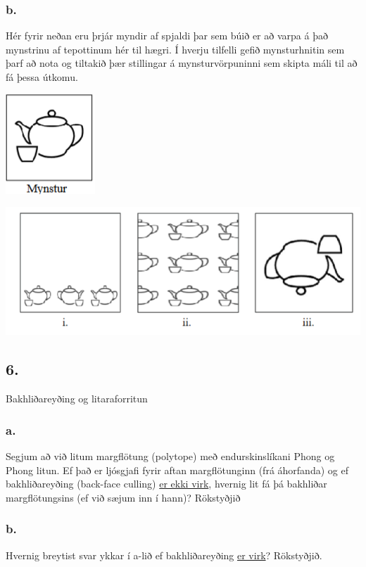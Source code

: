 \documentclass{article}
\begin{document}
\subsubsection{b.}Hér fyrir neðan eru þrjár myndir af spjaldi þar sem búið er að
varpa á það mynstrinu af tepottinum hér til hægri. Í hverju
tilfelli gefið mynsturhnitin sem þarf að nota og tiltakið þær
stillingar á mynsturvörpuninni sem skipta máli til að fá þessa
útkomu.

\includegraphics[scale = 0.9]{myndir/mynstur.png}

\begin{center}
\includegraphics[scale = 0.9]{myndir/mynstur2.png}
\end{center}


\newpage

\subsection{6.} Bakhliðareyðing og litaraforritun

\subsubsection{a.}Segjum að við litum margflötung (polytope) með endurskinslíkani Phong og
Phong litun. Ef það er ljósgjafi fyrir aftan margflötunginn (frá áhorfanda) og
ef bakhliðareyðing (back-face culling) \underline{er ekki virk}, hvernig lit fá þá bakhliðar
margflötungsins (ef við sæjum inn í hann)? Rökstyðjið

\subsubsection{b.}Hvernig breytist svar ykkar í a-lið ef bakhliðareyðing \underline{er virk}? Rökstyðjið.
\end{document}
